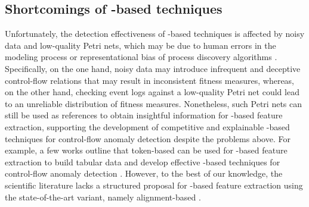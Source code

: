 \subsection{Shortcomings of -based techniques}
Unfortunately, the detection effectiveness of -based techniques is affected by noisy data and low-quality Petri nets, which may be due to human errors in the modeling process or representational bias of process discovery algorithms \cite{bezerra2013adlogspais, pecchia2020applicationfailuresanalysispm, aalst2016pm}. Specifically, on the one hand, noisy data may introduce infrequent and deceptive control-flow relations that may result in inconsistent fitness measures, whereas, on the other hand, checking event logs against a low-quality Petri net could lead to an unreliable distribution of fitness measures. Nonetheless, such Petri nets can still be used as references to obtain insightful information for -based feature extraction, supporting the development of competitive and explainable -based techniques for control-flow anomaly detection despite the problems above. For example, a few works outline that token-based  can be used for -based feature extraction to build tabular data and develop effective -based techniques for control-flow anomaly detection \cite{singh2022lapmsh, debenedictis2023dtadiiot}. However, to the best of our knowledge, the scientific literature lacks a structured proposal for -based feature extraction using the state-of-the-art  variant, namely alignment-based .

